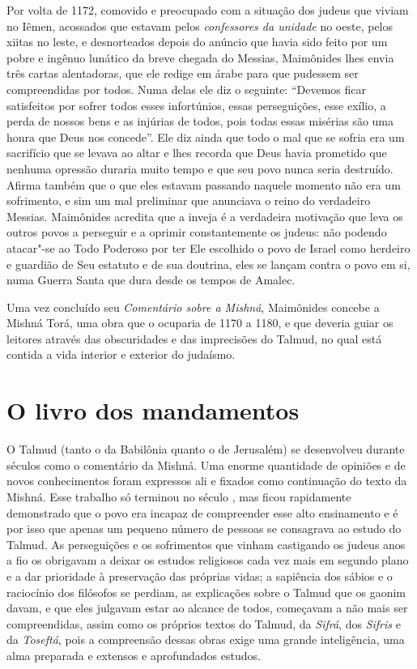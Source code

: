 Por volta de 1172, comovido e preocupado com a situação dos judeus que
viviam no Iêmen, acossados que estavam pelos \emph{confessores da unidade}
no oeste, pelos xiitas no leste, e desnorteados depois do anúncio que
havia sido feito por um pobre e ingênuo lunático da breve chegada do Messias, 
Maimônides lhes envia três cartas alentadoras, que ele
redige em árabe para que pudessem ser compreendidas por todos. Numa
delas ele diz o seguinte: ``Devemos ficar satisfeitos por sofrer todos
esses infortúnios, essas perseguições, esse exílio, a perda de nossos
bens e as injúrias de todos, pois todas essas misérias são uma honra que
Deus nos concede''. Ele diz ainda que todo o mal que se sofria era um
sacrifício que se levava ao altar e lhes recorda que Deus havia
prometido que nenhuma opressão duraria muito tempo e que seu povo nunca
seria destruído. Afirma também que o que eles estavam passando naquele
momento não era um sofrimento, e sim um mal preliminar que anunciava o
reino do verdadeiro Messias. Maimônides acredita que a inveja é a
verdadeira motivação que leva os outros povos a perseguir e a oprimir
constantemente os judeus: não podendo atacar"-se ao Todo Poderoso por
ter Ele escolhido o povo de Israel como herdeiro e guardião de Seu
estatuto e de sua doutrina, eles se lançam contra o povo em si, numa
Guerra Santa que dura desde os tempos de Amalec.

Uma vez concluído seu \emph{Comentário sobre a Mishná}, Maimônides
concebe a Mishná Torá, uma obra que o ocuparia de 1170 a 1180, e
que deveria guiar os leitores através das obscuridades e das
imprecisões do Talmud, no qual está contida a vida interior e exterior
do judaísmo.

\section{O livro dos mandamentos}

O Talmud (tanto o da Babilônia quanto o de Jerusalém) se
desenvolveu durante séculos como o comentário da Mishná. Uma
enorme quantidade de opiniões e de novos conhecimentos foram expressos
ali e fixados como continuação do texto da Mishná. Esse trabalho
só terminou no século , mas ficou rapidamente demonstrado que o povo
era incapaz de compreender esse alto ensinamento e é por isso que apenas
um pequeno número de pessoas se consagrava ao estudo do Talmud.
As perseguições e os sofrimentos que vinham castigando os judeus anos a
fio os obrigavam a deixar os estudos religiosos cada vez mais em segundo
plano e a dar prioridade à preservação das próprias vidas; a sapiência
dos sábios e o raciocínio dos filósofos se perdiam, as explicações sobre
o Talmud que os gaonim davam, e que eles julgavam estar ao
alcance de todos, começavam a não mais ser compreendidas, assim como os
próprios textos do Talmud, da \emph{Sifrá}, dos \emph{Sifris} e
da \emph{Toseftá}, pois a compreensão dessas obras exige uma grande
inteligência, uma alma preparada e extensos e aprofundados estudos.


